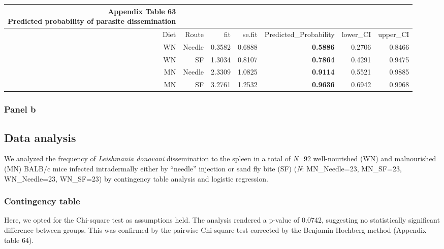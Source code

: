 \documentclass[
  12pt,
  letterpaper,
]{article}
\begin{document}
\begingroup
\fontsize{12.0pt}{14.4pt}\selectfont
\begin{longtable}{rrrrrrr}
\caption*{
{\large \textbf{Appendix Table 63}} \\ 
{\small \textbf{Predicted probability of parasite dissemination}}
} \\ 
\toprule
{Diet} & {Route} & {fit} & {se.fit} & Predicted\_Probability & lower\_CI & upper\_CI \\ 
\midrule\addlinespace[2.5pt]
WN & Needle & 0.3582 & 0.6888 & {\bfseries 0.5886} & 0.2706 & 0.8466 \\ 
WN & SF & 1.3034 & 0.8107 & {\bfseries 0.7864} & 0.4291 & 0.9475 \\ 
MN & Needle & 2.3309 & 1.0825 & {\bfseries 0.9114} & 0.5521 & 0.9885 \\ 
MN & SF & 3.2761 & 1.2532 & {\bfseries 0.9636} & 0.6942 & 0.9968 \\ 
\bottomrule
\end{longtable}
\endgroup

\subsubsection{Panel b}\label{panel-b}

\subsection{Data analysis}\label{data-analysis-3}

We analyzed the frequency of \emph{Leishmania donovani} dissemination to the spleen in a total of \emph{N}=92 well-nourished (WN) and malnourished (MN) BALB/c mice infected intradermally either by ``needle'' injection or sand fly bite (SF) (\emph{N}: MN\_Needle=23, MN\_SF=23, WN\_Needle=23, WN\_SF=23) by contingency table analysis and logistic regression.

\subsubsection{Contingency table}\label{contingency-table-1}

Here, we opted for the Chi-square test as assumptions held. The analysis rendered a p-value of 0.0742, suggesting no statistically significant difference between groups. This was confirmed by the pairwise Chi-square test corrected by the Benjamin-Hochberg method (Appendix table 64).
\end{document}
